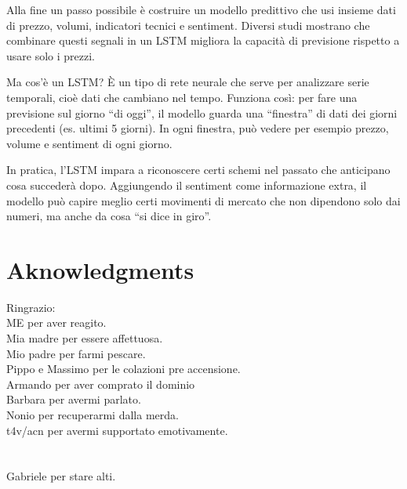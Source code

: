\documentclass[a4paper,12pt]{article}
\begin{document}
Alla fine un passo possibile è costruire un modello predittivo che usi insieme dati di prezzo, volumi, indicatori tecnici e sentiment. Diversi studi \parencite{turn0search0, turn0search13, turn0academia22} mostrano che combinare questi segnali in un LSTM migliora la capacità di previsione rispetto a usare solo i prezzi.

Ma cos’è un LSTM? È un tipo di rete neurale che serve per analizzare serie temporali, cioè dati che cambiano nel tempo. Funziona così: per fare una previsione sul giorno “di oggi”, il modello guarda una “finestra” di dati dei giorni precedenti (es. ultimi 5 giorni). In ogni finestra, può vedere per esempio prezzo, volume e sentiment di ogni giorno.

In pratica, l’LSTM impara a riconoscere certi schemi nel passato che anticipano cosa succederà dopo. Aggiungendo il sentiment come informazione extra, il modello può capire meglio certi movimenti di mercato che non dipendono solo dai numeri, ma anche da cosa “si dice in giro”.

\newpage
\printbibliography
\section{Aknowledgments}
Ringrazio: \\
    ME per aver reagito. \\
    Mia madre per essere affettuosa.\\
    Mio padre per farmi pescare.\\
    Pippo e Massimo per le colazioni pre accensione.\\
    Armando per aver comprato il dominio \\
    Barbara per avermi parlato.\\
    Nonio per recuperarmi dalla merda. \\
    t4v/acn per avermi supportato emotivamente.\\
\\
\\
Gabriele per stare alti.\\
\end{document}
